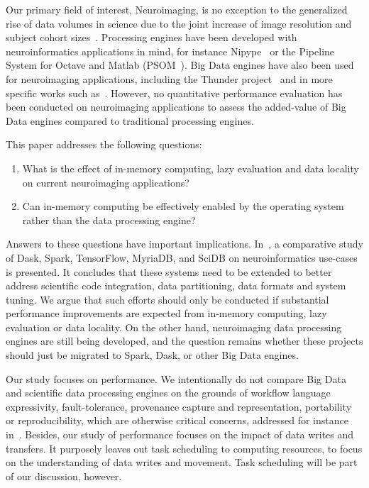 Our primary field of interest, Neuroimaging, is no exception to the generalized
rise of data volumes in science due to the joint increase of image resolution
and subject cohort sizes~\cite{van2014human}. Processing engines have been
developed with neuroinformatics applications in mind, for instance
Nipype~\cite{gorgolewski2011nipype} or the Pipeline System for Octave and Matlab
(PSOM~\cite{bellec2012pipeline}). Big Data engines have also been used for
neuroimaging applications, including the Thunder
project~\cite{freeman2014mapping} and in more specific works such
as~\cite{makkie2019fast}. However, no quantitative performance evaluation has
been conducted on neuroimaging applications to assess the added-value of Big
Data engines compared to traditional processing engines.

This paper addresses the following questions:
\begin{enumerate}
\item What is the effect of in-memory computing, lazy evaluation and data
locality on current neuroimaging applications?
\item Can in-memory computing be effectively enabled by the operating system
rather than the data processing engine?
\end{enumerate}

Answers to these questions have important implications.
In~\cite{mehta2017comparative}, a comparative study of Dask, Spark, TensorFlow,
MyriaDB, and SciDB on neuroinformatics use-cases is presented. It concludes that
these systems need to be extended to better address scientific code integration,
data partitioning, data formats and system tuning. We argue that such efforts
should only be conducted if substantial performance improvements are expected
from in-memory computing, lazy evaluation or data locality. On the other hand,
neuroimaging data processing engines are still being developed, and the question
remains whether these projects should just be migrated to Spark, Dask, or other
Big Data engines.

Our study focuses on performance. We intentionally do not compare Big Data and
scientific data processing engines on the grounds of workflow language
expressivity, fault-tolerance, provenance capture and representation,
portability or reproducibility, which are otherwise critical concerns, addressed
for instance in~\cite{samba}. Besides, our study of performance focuses on the
impact of data writes and transfers. It purposely leaves out task scheduling to
computing resources, to focus on the understanding of data writes and movement.
Task scheduling will be part of our discussion, however.


